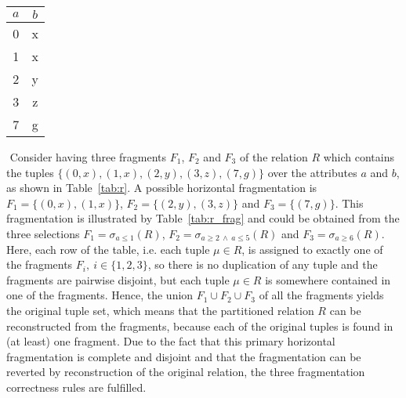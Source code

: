 \begin{exmp} \label{sec:theo_ddb_exmp}
$ $\newline
    \begin{center}
    \begin{tabular}{c|c} 
         $a$ & $b$\\
         \hline
         0 & x \\
         1 & x \\
         2 & y \\
         3 & z \\
         7 & g \\
    \end{tabular}
    \label{tab:r}
    \end{center}
$ $\newline
Consider having three fragments $F_1$, $F_2$ and $F_3$ of the relation $R$ which contains the tuples $\{(0,x), (1,x), (2,y), (3,z), (7,g)\}$ over the 
attributes $a$ and $b$, as shown in Table~\ref{tab:r}. 
A possible horizontal fragmentation is $F_1=\{(0,x), (1,x)\}$, $F_2=\{(2,y), (3,z)\}$ and $F_3=\{(7,g)\}$. 
This fragmentation is illustrated by Table~\ref{tab:r_frag} and could be obtained from the three selections $F_1=\sigma_{a \leq 1}(R)$,
$F_2=\sigma_{a \geq 2~\land~a \leq 5}(R)$ and $F_3=\sigma_{a \geq 6}(R)$. Here, each row of the table, i.e. each tuple $\mu \in R$, is assigned to exactly one
of the fragments $F_i,~i\in\{1,2,3\}$, so there is no duplication of any tuple and the fragments are pairwise disjoint, but each tuple $\mu \in R$ is somewhere
contained in one of the fragments. 
Hence, the union $F_1 \cup F_2 \cup F_3$ of all the fragments yields the original tuple set, which means that the partitioned relation $R$ can be reconstructed
from the fragments, because each of the original tuples is found in (at least) one fragment. Due to the fact that this primary horizontal fragmentation is
complete and disjoint and that the fragmentation can be reverted by reconstruction of the original relation, the three fragmentation correctness rules
\cite[p.~103]{Ozsu1991} are fulfilled.


\end{exmp}
